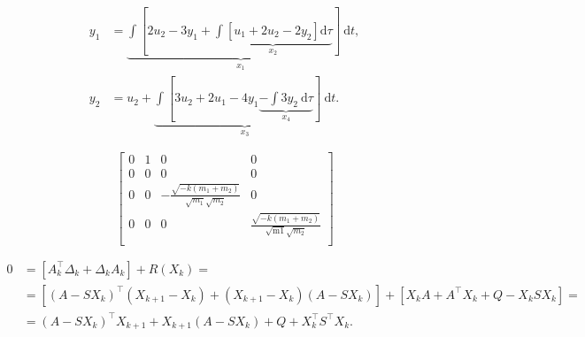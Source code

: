 \begin{align*}
y_1 &= \underbrace{\int \left[2u_2 - 3y_1 + \underbrace{\int \left[u_1 + 2u_2 - 2y_2\right] \mathrm{d}\tau}_{x_2} \right]\ \mathrm{d}t}_{x_1}, \\
y_2 &= u_2 + \underbrace{\int \left[3u_2 + 2u_1 - 4y_1 \underbrace{- \int 3y_2\ \mathrm{d}\tau}_{x_4} \right]\ \mathrm{d}t}_{x_3}.
\end{align*}

\[\left[\begin{array}{cccc}
 0 & 1 & 0 & 0\\
 0 & 0 & 0 & 0\\
 0 & 0 & -\frac{\sqrt{-k (m_1+m_2)}}{\sqrt{m_1} \sqrt{m_2}} & 0\\
 0 & 0 & 0 & \frac{\sqrt{-k (m_1+m_2)}}{\sqrt{\text{m1}} \sqrt{m_2}}\\
\end{array}\right]\]

\begin{equation}
\begin{aligned}
0 &= [A_k^\top \Delta_k + \Delta_k A_k] + R(X_k) = \\
&= [(A - SX_k)^\top (X_{k+1} - X_k) + (X_{k+1} - X_k)(A - SX_k)] + [X_kA + A^\top X_k + Q - X_kSX_k] = \\
&= (A - SX_k)^\top X_{k+1} + X_{k+1}(A - SX_k) + Q + X_k^\top S^\top X_k.
\end{aligned} \label{xk}
\end{equation}